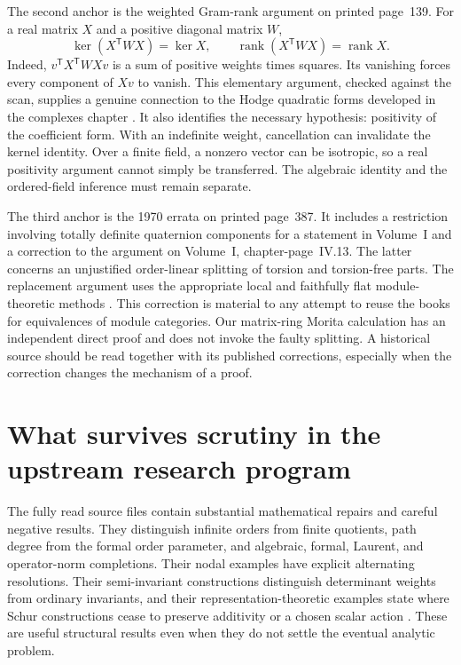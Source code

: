 The second anchor is the weighted Gram-rank argument on printed page~139.
For a real matrix \(X\) and a positive diagonal matrix \(W\),
\[
 \ker(X^{\mathsf T}WX)=\ker X,
 \qquad
 \operatorname{rank}(X^{\mathsf T}WX)=\operatorname{rank}X.
\]
Indeed, \(v^{\mathsf T}X^{\mathsf T}WXv\) is a sum of positive weights
times squares. Its vanishing forces every component of \(Xv\) to vanish.
This elementary argument, checked against the scan, supplies a genuine
connection to the Hodge quadratic forms developed in the complexes chapter
\cite{v2Roggenkamp1970II}. It also identifies the necessary hypothesis:
positivity of the coefficient form. With an indefinite weight, cancellation
can invalidate the kernel identity. Over a finite field, a nonzero vector
can be isotropic, so a real positivity argument cannot simply be transferred.
The algebraic identity and the ordered-field inference must remain separate.

The third anchor is the 1970 errata on printed page~387. It includes a
restriction involving totally definite quaternion components for a statement
in Volume~I and a correction to the argument on Volume~I, chapter-page~IV.13.
The latter concerns an unjustified order-linear splitting of torsion and
torsion-free parts. The replacement argument uses the appropriate local
and faithfully flat module-theoretic methods
\cite{v2Roggenkamp1970II,RoggenkampHuberDyson1970}. This correction is
material to any attempt to reuse the books for equivalences of module
categories. Our matrix-ring Morita calculation has an independent direct
proof and does not invoke the faulty splitting. A historical source should
be read together with its published corrections, especially when the
correction changes the mechanism of a proof.

\section{What survives scrutiny in the upstream research program}

The fully read source files contain substantial mathematical repairs and
careful negative results. They distinguish infinite orders from finite
quotients, path degree from the formal order parameter, and algebraic,
formal, Laurent, and operator-norm completions. Their nodal examples have
explicit alternating resolutions. Their semi-invariant constructions
distinguish determinant weights from ordinary invariants, and their
representation-theoretic examples state where Schur constructions cease to
preserve additivity or a chosen scalar action \cite{GRHRepo}. These are
useful structural results even when they do not settle the eventual analytic
problem.

